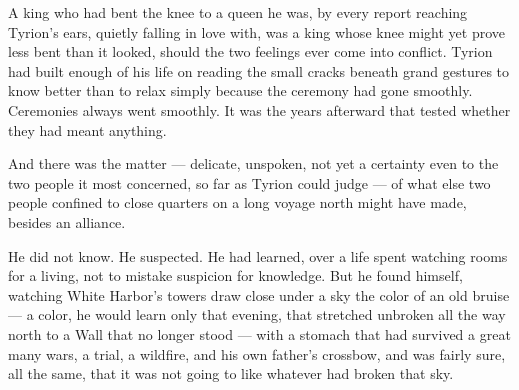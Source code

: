 A king who had bent the knee to a queen he was, by every report reaching Tyrion’s ears, quietly falling in love with, was a king whose knee might yet prove less bent than it looked, should the two feelings ever come into conflict. Tyrion had built enough of his life on reading the small cracks beneath grand gestures to know better than to relax simply because the ceremony had gone smoothly. Ceremonies always went smoothly. It was the years afterward that tested whether they had meant anything.

And there was the matter — delicate, unspoken, not yet a certainty even to the two people it most concerned, so far as Tyrion could judge — of what else two people confined to close quarters on a long voyage north might have made, besides an alliance.

He did not know. He suspected. He had learned, over a life spent watching rooms for a living, not to mistake suspicion for knowledge. But he found himself, watching White Harbor’s towers draw close under a sky the color of an old bruise — a color, he would learn only that evening, that stretched unbroken all the way north to a Wall that no longer stood — with a stomach that had survived a great many wars, a trial, a wildfire, and his own father’s crossbow, and was fairly sure, all the same, that it was not going to like whatever had broken that sky.